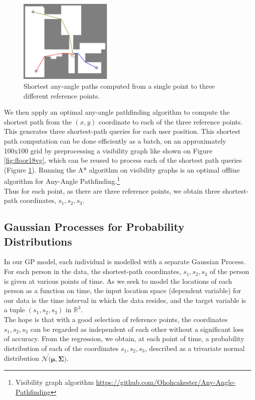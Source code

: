 \documentclass[letterpaper]{article}
\begin{document}
\begin{figure}[!h]
  \centering
    \includegraphics[width=170px]{diagrams/floor18shortestpaths.png}
  \caption{Shortest any-angle paths computed from a single point to three different reference points.}
  \label{fig:floor18sps}
\end{figure}

We then apply an optimal any-angle pathfinding algorithm to compute the shortest path from the $(x,y)$ coordinate to each of the three reference points. This generates three shortest-path queries for each user position. This shortest path computation can be done efficiently as a batch, on an approximately 100x100 grid by preprocessing a visibility graph like shown on Figure \ref{fig:floor18vg}, which can be reused to process each of the shortest path queries (Figure \ref{fig:floor18sps}). Running the A* algorithm on visibility graphs is an optimal offline algorithm for Any-Angle Pathfinding.\footnote{Visibility graph algorithm \url{https://github.com/Ohohcakester/Any-Angle-Pathfinding}}\\

Thus for each point, as there are three reference points, we obtain three shortest-path coordinates, $s_1, s_2, s_3$.

\subsection{Gaussian Processes for Probability Distributions}

In our GP model, each individual is modelled with a separate Gaussian Process. For each person in the data, the shortest-path coordinates, $s_1, s_2, s_3$ of the person is given at various points of time. As we seek to model the locations of each person as a function on time, the input location space (dependent variable) for our data is the time interval in which the data resides, and the target variable is a tuple $(s_1, s_2, s_3)$ in $\mathbb{R}^3$. \\

The hope is that with a good selection of reference points, the coordinates $s_1, s_2, s_3$ can be regarded as independent of each other without a significant loss of accuracy. From the regression, we obtain, at each point of time, a probability distribution of each of the coordinates $s_1, s_2, s_3$, described as a trivariate normal distribution $\mathcal{N}\tilde (\boldsymbol{\mu},\boldsymbol{\Sigma})$. \\
\end{document}
